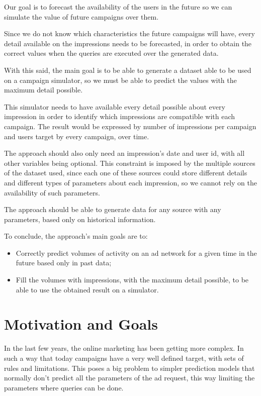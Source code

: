 \documentclass[9pt,a4paper]{extarticle}
\begin{document}
\begin{multicols}{2}
Our goal is to forecast the availability of the users in the future so we can
simulate the value of future campaigns over them.

Since we do not know which characteristics the future campaigns will have, every
detail available on the impressions needs to be forecasted, in order to
obtain the correct values when the queries are executed over the generated data.

With this said, the main goal is to be able to generate a dataset able to be used on a campaign
simulator, so we must be able to predict the values with the maximum detail
possible.

This simulator needs to have available every detail possible about every
impression in order to identify which impressions are compatible with each
campaign. The result would be expressed by number of impressions per campaign and
users target by every campaign, over time.

The approach should also only need an impression's date and user id, with all
other variables being optional.
This constraint is imposed by the multiple sources of the dataset used, since
each one of these sources could store different details and different types of
parameters about each impression, so we cannot rely on the availability of
such parameters.

The approach should be able to generate data for any source
with any parameters, based only on historical information.

To conclude, the approach's main goals are to:
\begin{itemize}
\item Correctly predict volumes of activity on an ad network for a given time in
  the future based only in past data;
\item Fill the volumes with impressions, with the maximum detail possible, to be
  able to use the obtained result on a simulator.
\end{itemize}

\section{Motivation and Goals} \label{sec:goals}

In the last few years, the online marketing has been getting more complex. In
such a way that today campaigns have a very well defined target, with
sets of rules and limitations. This poses a big problem to
simpler prediction models that normally don't predict all the parameters of the
ad request, this way limiting the parameters where queries can be done.



\end{multicols}
\end{document}
